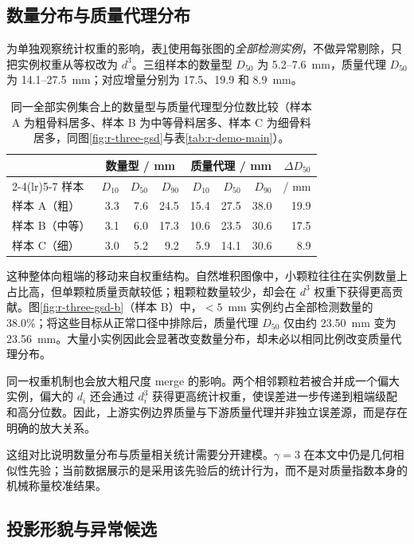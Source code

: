 \subsection{数量分布与质量代理分布}

为单独观察统计权重的影响，表\ref{tab:r-number-mass}使用每张图的\emph{全部检测实例}，不做异常剔除，只把实例权重从等权改为 $d^3$。三组样本的数量型 $D_{50}$ 为 5.2--7.6~mm，质量代理 $D_{50}$ 为 14.1--27.5~mm；对应增量分别为 17.5、19.9 和 8.9~mm。

\begin{table}[t]
\centering
\caption{同一全部实例集合上的数量型与质量代理型分位数比较（样本 A 为粗骨料居多、样本 B 为中等骨料居多、样本 C 为细骨料居多，同图\ref{fig:r-three-gsd}与表\ref{tab:r-demo-main}）。}
\label{tab:r-number-mass}
\footnotesize
\renewcommand{\arraystretch}{1.12}
\begin{tabular}{lrrrrrrr}
\toprule
& \multicolumn{3}{c}{数量型 / mm} & \multicolumn{3}{c}{质量代理 / mm} & $\Delta D_{50}$ \\
\cmidrule(lr){2-4}\cmidrule(lr){5-7}
样本 & $D_{10}$ & $D_{50}$ & $D_{90}$ & $D_{10}$ & $D_{50}$ & $D_{90}$ & / mm \\
\midrule
样本 A（粗） & 3.3 & 7.6 & 24.5 & 15.4 & 27.5 & 38.0 & 19.9 \\
样本 B（中等） & 3.1 & 6.0 & 17.3 & 10.6 & 23.5 & 30.6 & 17.5 \\
样本 C（细） & 3.0 & 5.2 & 9.2 & 5.9 & 14.1 & 30.6 & 8.9 \\
\bottomrule
\end{tabular}
\end{table}

这种整体向粗端的移动来自权重结构。自然堆积图像中，小颗粒往往在实例数量上占比高，但单颗粒质量贡献较低；粗颗粒数量较少，却会在 $d^3$ 权重下获得更高贡献。图\ref{fig:r-three-gsd-b}（样本 B）中，$<5$~mm 实例约占全部检测数量的 38.0\%；将这些目标从正常口径中排除后，质量代理 $D_{50}$ 仅由约 23.50~mm 变为 23.56~mm。大量小实例因此会显著改变数量分布，却未必以相同比例改变质量代理分布。

同一权重机制也会放大粗尺度 merge 的影响。两个相邻颗粒若被合并成一个偏大实例，偏大的 $d_i$ 还会通过 $d_i^3$ 获得更高统计权重，使误差进一步传递到粗端级配和高分位数。因此，上游实例边界质量与下游质量代理并非独立误差源，而是存在明确的放大关系。

这组对比说明数量分布与质量相关统计需要分开建模。$\gamma=3$ 在本文中仍是几何相似性先验；当前数据展示的是采用该先验后的统计行为，而不是对质量指数本身的机械称量校准结果。

\subsection{投影形貌与异常候选}

